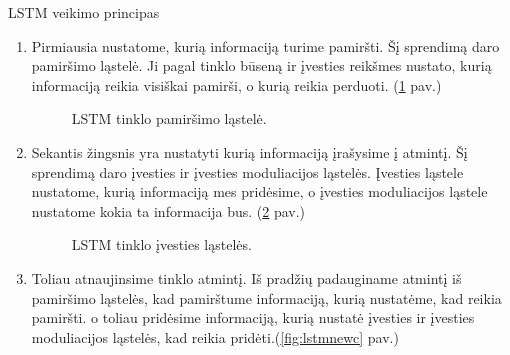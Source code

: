 LSTM veikimo principas \cite{Christopher2015}
\begin{enumerate}
  \item Pirmiausia nustatome, kurią informaciją turime pamiršti. Šį sprendimą daro pamiršimo ląstelė. Ji pagal tinklo būseną ir įvesties reikšmes nustato, kurią informaciją reikia visiškai pamirši, o kurią reikia perduoti. (\ref{fig:lstmforget} pav.)
  \begin{figure}[h!]
    \centering
  \caption{LSTM tinklo pamiršimo ląstelė.}
  \label{fig:lstmforget}
  \end{figure}
  \item Sekantis žingsnis yra nustatyti kurią informaciją įrašysime į atmintį. Šį sprendimą daro įvesties ir įvesties moduliacijos ląstelės. Įvesties ląstele nustatome, kurią informaciją mes pridėsime, o įvesties moduliacijos ląstele nustatome kokia ta informacija bus. (\ref{fig:lstminput} pav.)
\begin{figure}[h!]
  \centering
{}
\caption{LSTM tinklo įvesties ląstelės.}
\label{fig:lstminput}
\end{figure}
\item Toliau atnaujinsime tinklo atmintį. Iš pradžių padauginame atmintį iš pamiršimo ląstelės, kad pamirštume informaciją, kurią nustatėme, kad reikia pamiršti. o toliau pridėsime informaciją, kurią nustatė įvesties ir įvesties moduliacijos ląstelės, kad reikia pridėti.(\ref{fig:lstmnewc} pav.)

\end{enumerate}
